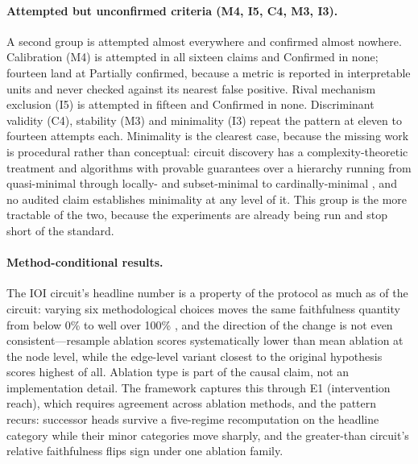 \documentclass{article}
\begin{document}
\paragraph{Attempted but unconfirmed criteria (M4, I5, C4, M3, I3).} A second group is attempted almost everywhere and confirmed almost nowhere. Calibration (M4) is attempted in all sixteen claims and Confirmed in none; fourteen land at Partially confirmed, because a metric is reported in interpretable units and never checked against its nearest false positive. Rival mechanism exclusion (I5) is attempted in fifteen and Confirmed in none. Discriminant validity (C4), stability (M3) and minimality (I3) repeat the pattern at eleven to fourteen attempts each. Minimality is the clearest case, because the missing work is procedural rather than conceptual: circuit discovery has a complexity-theoretic treatment \citep{adolfi2025complexity} and algorithms with provable guarantees over a hierarchy running from quasi-minimal through locally- and subset-minimal to cardinally-minimal \citep{hadad2026formal}, and no audited claim establishes minimality at any level of it. This group is the more tractable of the two, because the experiments are already being run and stop short of the standard.

\paragraph{Method-conditional results.} The IOI circuit's headline number is a property of the protocol as much as of the circuit: varying six methodological choices moves the same faithfulness quantity from below 0\% to well over 100\% \citep{miller2024transformer}, and the direction of the change is not even consistent---resample ablation scores systematically lower than mean ablation at the node level, while the edge-level variant closest to the original hypothesis scores highest of all. Ablation type is part of the causal claim, not an implementation detail. The framework captures this through E1 (intervention reach), which requires agreement across ablation methods, and the pattern recurs: successor heads survive a five-regime recomputation on the headline category while their minor categories move sharply, and the greater-than circuit's relative faithfulness flips sign under one ablation family.
\end{document}
